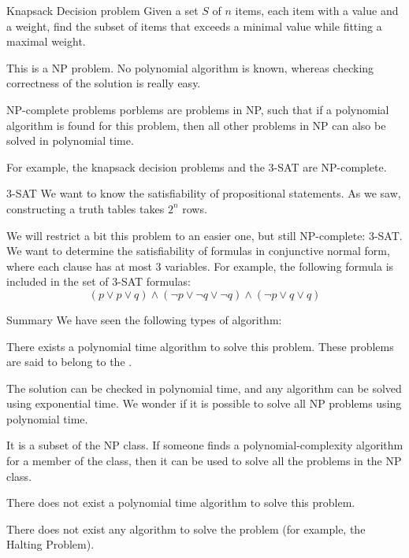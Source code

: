 \documentclass[a4paper]{article}
\begin{document}
\begin{parag}{Knapsack Decision problem}
    Given a set $S$ of $n$ items, each item with a value and a weight, find the subset of items that exceeds a minimal value while fitting a maximal weight.

    This is a NP problem. No polynomial algorithm is known, whereas checking correctness of the solution is really easy.
\end{parag}

\begin{parag}{NP-complete problems}
     porblems are problems in NP, such that if a polynomial algorithm is found for this problem, then all other problems in NP can also be solved in polynomial time.

    For example, the knapsack decision problems and the 3-SAT are NP-complete.
\end{parag}

\begin{parag}{3-SAT}
    We want to know the satisfiability of propositional statements. As we saw, constructing a truth tables takes $2^n$ rows.

    We will restrict a bit this problem to an easier one, but still NP-complete: 3-SAT. We want to determine the satisfiability of formulas in conjunctive normal form, where each clause has at most 3 variables. For example, the following formula is included in the set of 3-SAT formulas:
    \[\left(p \lor p \lor q\right) \land \left(\lnot p \lor \lnot q \lor \lnot q\right) \land \left(\lnot p \lor q \lor q\right)\]
\end{parag}

\begin{parag}{Summary}
    We have seen the following types of algorithm:

    \begin{description}[left=0pt]
        \item[Tractable problem:] There exists a polynomial time algorithm to solve this problem. These problems are said to belong to the .
        \item[Class NP:] The solution can be checked in polynomial time, and any algorithm can be solved using exponential time. We wonder if it is possible to solve all NP problems using polynomial time.
        \item[NP Complete Class:] It is a subset of the NP class. If someone finds a polynomial-complexity algorithm for a member of the class, then it can be used to solve all the problems in the NP class.
        \item[Intractable Problems:] There does not exist a polynomial time algorithm to solve this problem.
        \item[Unsolvable Problem] There does not exist any algorithm to solve the problem (for example, the Halting Problem).
    \end{description}

\end{parag}
\end{document}
